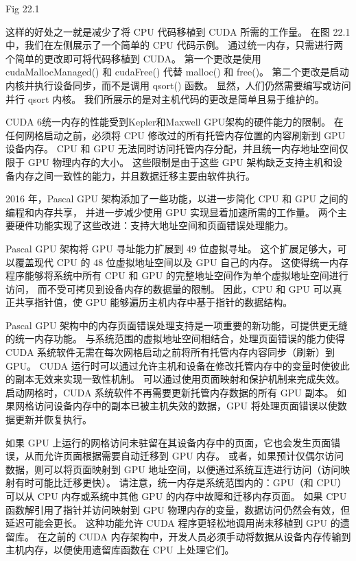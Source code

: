 {\color{red} Fig 22.1}

这样的好处之一就是减少了将 CPU 代码移植到 CUDA 所需的工作量。 在图 22.1 中，我们在左侧展示了一个简单的 CPU 代码示例。 
通过统一内存，只需进行两个简单的更改即可将代码移植到 CUDA。 
第一个更改是使用 cudaMallocManaged() 和 cudaFree() 代替 malloc() 和 free()。 
第二个更改是启动内核并执行设备同步，而不是调用 qsort() 函数。 
显然，人们仍然需要编写或访问并行 qsort 内核。 我们所展示的是对主机代码的更改是简单且易于维护的。

CUDA 6统一内存的性能受到Kepler和Maxwell GPU架构的硬件能力的限制。 
在任何网格启动之前，必须将 CPU 修改过的所有托管内存位置的内容刷新到 GPU 设备内存。 
CPU 和 GPU 无法同时访问托管内存分配，并且统一内存地址空间仅限于 GPU 物理内存的大小。 
这些限制是由于这些 GPU 架构缺乏支持主机和设备内存之间一致性的能力，并且数据迁移主要由软件执行。

2016 年，Pascal GPU 架构添加了一些功能，以进一步简化 CPU 和 GPU 之间的编程和内存共享，
并进一步减少使用 GPU 实现显着加速所需的工作量。 两个主要硬件功能实现了这些改进：支持大地址空间和页面错误处理能力。

Pascal GPU 架构将 GPU 寻址能力扩展到 49 位虚拟寻址。 
这个扩展足够大，可以覆盖现代 CPU 的 48 位虚拟地址空间以及 GPU 自己的内存。 
这使得统一内存程序能够将系统中所有 CPU 和 GPU 的完整地址空间作为单个虚拟地址空间进行访问，
而不受可拷贝到设备内存的数据量的限制。 因此，CPU 和 GPU 可以真正共享指针值，使 GPU 能够遍历主机内存中基于指针的数据结构。

Pascal GPU 架构中的内存页面错误处理支持是一项重要的新功能，可提供更无缝的统一内存功能。 
与系统范围的虚拟地址空间相结合，处理页面错误的能力使得 CUDA 系统软件无需在每次网格启动之前将所有托管内存内容同步（刷新）到 GPU。 
CUDA 运行时可以通过允许主机和设备在修改托管内存中的变量时使彼此的副本无效来实现一致性机制。 
可以通过使用页面映射和保护机制来完成失效。 启动网格时，CUDA 系统软件不再需要更新托管内存数据的所有 GPU 副本。 
如果网格访问设备内存中的副本已被主机失效的数据，GPU 将处理页面错误以使数据更新并恢复执行。

如果 GPU 上运行的网格访问未驻留在其设备内存中的页面，它也会发生页面错误，从而允许页面根据需要自动迁移到 GPU 内存。 
或者，如果预计仅偶尔访问数据，则可以将页面映射到 GPU 地址空间，以便通过系统互连进行访问（访问映射有时可能比迁移更快）。 
请注意，统一内存是系统范围内的：GPU（和 CPU）可以从 CPU 内存或系统中其他 GPU 的内存中故障和迁移内存页面。 
如果 CPU 函数解引用了指针并访问映射到 GPU 物理内存的变量，数据访问仍然会有效，但延迟可能会更长。 
这种功能允许 CUDA 程序更轻松地调用尚未移植到 GPU 的遗留库。 
在之前的 CUDA 内存架构中，开发人员必须手动将数据从设备内存传输到主机内存，以便使用遗留库函数在 CPU 上处理它们。

